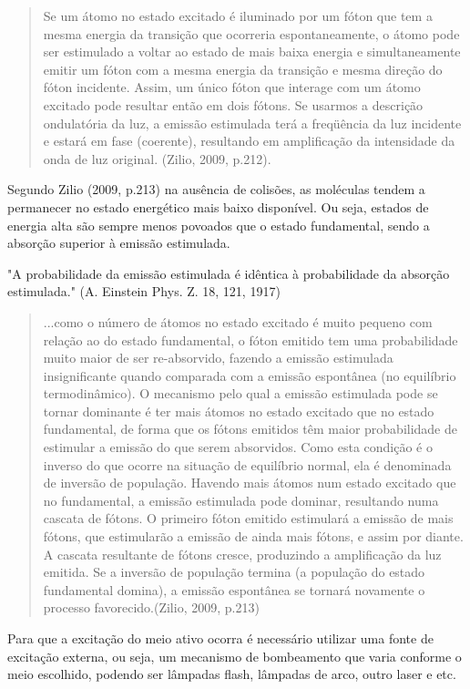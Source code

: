\documentclass[numeric]{fei}
\begin{document}
\begin{quote}
Se um átomo no estado excitado é iluminado por um fóton que tem a mesma energia da transição que ocorreria espontaneamente, o átomo pode ser estimulado a voltar ao estado de mais baixa energia e simultaneamente emitir um fóton com a mesma energia da transição e mesma direção do fóton incidente. Assim, um único fóton que interage com um átomo excitado pode resultar então em dois fótons. Se usarmos a descrição ondulatória da luz, a emissão estimulada terá a freqüência da luz incidente e estará em fase (coerente), resultando em amplificação da intensidade da onda de luz original. (Zilio, 2009, p.212).
\end{quote}

Segundo Zilio (2009, p.213) na ausência de colisões, as moléculas tendem a permanecer no estado energético mais baixo disponível. Ou seja, estados de energia alta são sempre menos povoados que o estado fundamental, sendo a absorção superior à emissão estimulada.

"A probabilidade da emissão estimulada é idêntica à probabilidade da absorção estimulada." (A. Einstein Phys. Z. 18, 121, 1917)

\begin{quote}
...como o número de átomos no estado excitado é muito pequeno com relação ao do estado fundamental, o fóton emitido tem uma probabilidade muito maior de ser re-absorvido, fazendo a emissão estimulada insignificante quando comparada com a emissão espontânea (no equilíbrio termodinâmico). O mecanismo pelo qual a emissão estimulada pode se tornar dominante é ter mais átomos no estado excitado que no estado fundamental, de forma que os fótons emitidos têm maior probabilidade de estimular a emissão do que serem absorvidos. Como esta condição é o inverso do que ocorre na situação de equilíbrio normal, ela é denominada de inversão de população. Havendo mais átomos num estado excitado que no fundamental, a emissão estimulada pode dominar, resultando numa cascata de fótons. O primeiro fóton emitido estimulará a emissão de mais fótons, que estimularão a emissão de ainda mais fótons, e assim por diante. A cascata resultante de fótons cresce, produzindo a amplificação da luz emitida. Se a inversão de população termina (a população do estado fundamental domina), a emissão espontânea se tornará novamente o processo favorecido.(Zilio, 2009, p.213)
\end{quote}

Para que a excitação do meio ativo ocorra é necessário utilizar uma fonte de excitação externa, ou seja, um mecanismo de bombeamento que varia conforme o meio escolhido, podendo ser lâmpadas flash, lâmpadas de arco, outro laser e etc.
\end{document}
